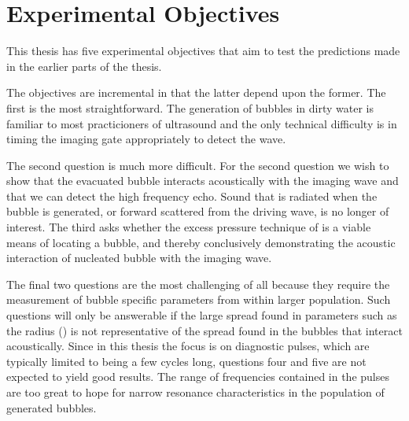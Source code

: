 \section{Experimental Objectives} \label{sec:WE:objectives}

This thesis has five experimental objectives that aim to test the predictions made in the earlier parts of the thesis.

The objectives are incremental in that the latter depend upon the former.
The first is the most straightforward.
The generation of bubbles in dirty water is familiar to most practicioners of ultrasound
and the only technical difficulty is in timing the imaging gate appropriately to detect the wave.

The second question is much more difficult.
For the second question we wish to show that the evacuated bubble interacts acoustically with the imaging wave
and that we can detect the high frequency echo.
Sound that is radiated when the bubble is generated,
or forward scattered from the driving wave, is no longer of interest.
The third asks whether the excess pressure technique of  is a viable means of locating a bubble, 
and thereby conclusively demonstrating the acoustic interaction of nucleated bubble with the imaging wave.

The final two questions are the most challenging of all because they require
the measurement of bubble specific parameters from within larger population.
Such questions will only be answerable if the large  spread found in parameters such
as the radius () is not representative of the spread found in the bubbles that interact acoustically.
Since in this thesis the focus is on diagnostic pulses, 
which are typically limited to being a few cycles long,
questions four and five are not expected to yield good results.
The range of frequencies contained in the pulses are too great to hope for narrow resonance characteristics in the population of generated bubbles.


